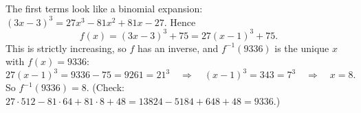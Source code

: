 The first terms look like a binomial expansion: $(3x-3)^3=27x^3-81x^2+81x-27$. Hence
\[f(x)=(3x-3)^3+75=27(x-1)^3+75.\]
This is strictly increasing, so $f$ has an inverse, and $f^{-1}(9336)$ is the unique $x$ with $f(x)=9336$:
\[27(x-1)^3=9336-75=9261=21^3\quad\Longrightarrow\quad(x-1)^3=343=7^3\quad\Longrightarrow\quad x=8.\]
So $f^{-1}(9336)=\boxed{8}$. (Check: $27\cdot512-81\cdot64+81\cdot8+48=13824-5184+648+48=9336$.)
